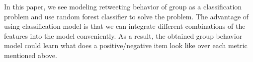 In this paper, we see modeling retweeting behavior of group as a classification problem and use random forest classifier to solve the problem. The advantage of using classification model is that we can integrate different combinations of the features into the model conveniently. As a result, the obtained group behavior model could learn what does a positive/negative item look like over each metric mentioned above.\par











